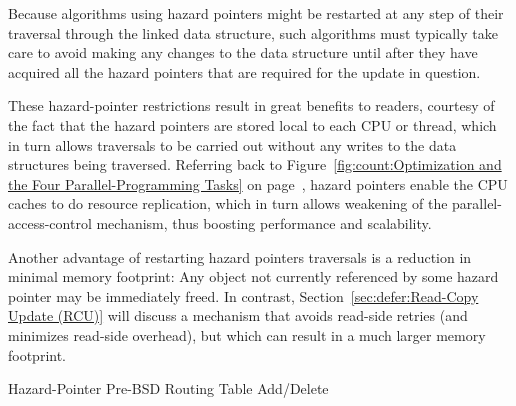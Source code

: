 \QuickQuizEnd

Because algorithms using hazard pointers might be restarted at any
step of their traversal through the linked data structure, such algorithms
must typically take care to avoid making any changes to the data
structure until after they have acquired all the hazard pointers that
are required for the update in question.

\QuickQuizEnd

These hazard-pointer restrictions result in great benefits to readers,
courtesy of the fact that the hazard pointers are stored local to each
CPU or thread, which in turn allows traversals to be carried out without
any writes to the data structures being traversed.
Referring back to
Figure~\ref{fig:count:Optimization and the Four Parallel-Programming Tasks}
on
page~\pageref{fig:count:Optimization and the Four Parallel-Programming Tasks},
hazard pointers enable the CPU caches to do resource replication, which
in turn allows weakening of the parallel-access-control mechanism,
thus boosting performance and scalability.

Another advantage of restarting hazard pointers traversals is a reduction in
minimal memory footprint:
Any object not currently referenced by some hazard pointer may be
immediately freed.
In contrast,
Section~\ref{sec:defer:Read-Copy Update (RCU)}
will discuss a mechanism that avoids read-side retries (and minimizes
read-side overhead), but which can result in a much larger memory
footprint.

\begin{listing}

\caption{Hazard-Pointer Pre-BSD Routing Table Add\slash Delete}
\label{lst:defer:Hazard-Pointer Pre-BSD Routing Table Add/Delete}
\end{listing}

